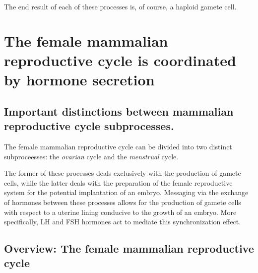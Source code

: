 \documentclass{article}
\begin{document}
The end result of each of these processes is, of course, a haploid
gamete cell.

\section{The female mammalian reproductive cycle is coordinated by hormone secretion}

\subsection{Important distinctions between mammalian reproductive cycle subprocesses.}

The female mammalian reproductive cycle can be divided into two distinct subproceesses:
the \emph{ovarian} cycle and the \emph{menstrual} cycle.

The former of these processes deals exclusively with the production of gamete cells,
while the latter deals with the preparation of the female reproductive system for the
potential implantation of an embryo. Messaging via the exchange of hormones between these
processes allows for the production of gamete cells with respect to a uterine lining
conducive to the growth of an embryo. More specifically, LH and FSH hormones act to
mediate this synchronization effect.

\pagebreak

\subsection{Overview: The female mammalian reproductive cycle}
\end{document}
